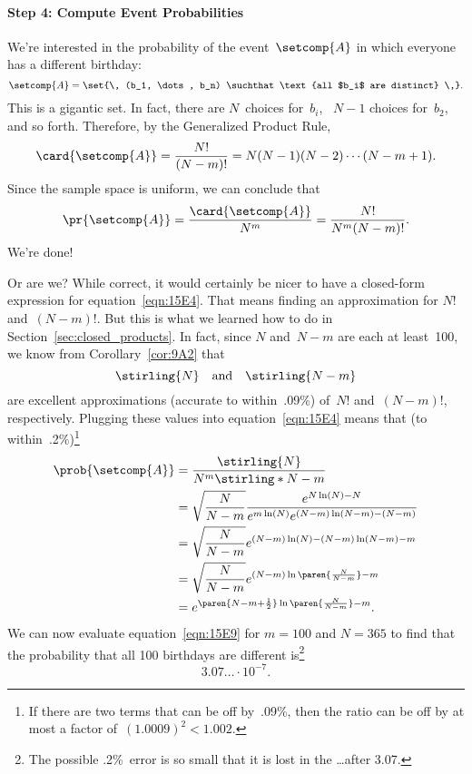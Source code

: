 \paragraph{Step 4: Compute Event Probabilities}

We're interested in the probability of the event~$\setcomp{A}$ in
which everyone has a different birthday:
\begin{equation*}
    \setcomp{A} = \set{\, (b_1, \dots, b_n) \suchthat
                            \text{all $b_i$ are distinct} \,}.
\end{equation*}
This is a gigantic set.  In fact, there are $N$~choices for~$b_i$,
\ $N - 1$ choices for~$b_2$, and so forth.  Therefore, by the
Generalized Product Rule,
\begin{equation*}
\card{\setcomp{A}}
    = \frac{N!}{(N - m)!}
    = N (N - 1) (N - 2) \cdots (N - m + 1).
\end{equation*}
Since the sample space is uniform, we can conclude that
\begin{equation}\label{eqn:15E4}
\pr{\setcomp{A}}
    = \frac{\card{\setcomp{A}}}{N^m} \\
    = \frac{N!}{N^m (N - m)!}.
\end{equation}
We're done!

Or are we?  While correct, it would certainly be nicer to have a
closed-form expression for equation~\eqref{eqn:15E4}.  That means
finding an approximation for $N!$ and~$(N - m)!$.  But this is what we
learned how to do in Section~\ref{sec:closed_products}.  In fact, since
$N$ and~$N - m$ are each at least~100, we know from
Corollary~\ref{cor:9A2} that
\begin{equation*}
    \stirling{N} \quad \text{and} \quad \stirling{N - m}
\end{equation*}
are excellent approximations (accurate to within~.09\%) of~$N!$ and~$(N
- m)!$, respectively.  Plugging these values into
equation~\eqref{eqn:15E4} means that (to within~.2\%)\footnote{If there
are two terms that can be off by~.09\%, then the ratio can be off by
at most a factor of~$(1.0009)^2 < 1.002$.}
\begingroup
{}\jot
\begin{align}
\prob{\setcomp{A}}
    &= \frac{ \stirling{N} }{ N^m \stirling*{N - m} } \notag\\
    &= \sqrt{\frac{N}{N - m}}
             \frac{ e^{N \ln(N) - N} }
                  { e^{m \ln(N)} e^{(N - m) \ln(N - m) - (N - m) } }
                  \notag\\
    &= \sqrt{\frac{N}{N - m}}
         e^{ (N - m)\ln(N) - (N - m) \ln(N - m) - m } \notag\\
    &= \sqrt{\frac{N}{N - m}}
         e^{ (N - m)\ln\paren{\frac{N}{N - m}} - m } \notag\\
    &= e^{ \paren{N - m + \frac{1}{2}}\ln\paren{\frac{N}{N - m}} - m }.
        \label{eqn:15E9}
\end{align}
\endgroup
We can now evaluate equation~\eqref{eqn:15E9} for $m = 100$ and $N =
365$ to find that the probability that all 100 birthdays are different
is\footnote{The possible .2\%~error is so small that
  it is lost in the \dots after 3.07.}
\begin{equation*}
    3.07\ldots \cdot 10^{-7}.
\end{equation*}

